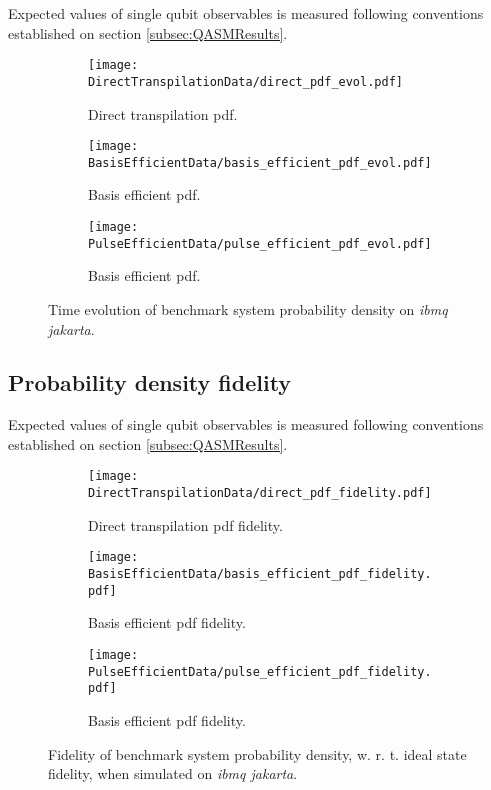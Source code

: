       Expected values of single qubit observables is measured following conventions established on section \ref{subsec:QASMResults}. 

      \begin{figure}
        \centering
        \begin{subfigure}[b]{1.0 \textwidth}
          \centering
          \texttt{[image: DirectTranspilationData/direct\_pdf\_evol.pdf]}
          \caption{Direct transpilation pdf.}
          \label{fig:PdfDirectTransp}
        \end{subfigure}
        \begin{subfigure}[b]{1.0 \textwidth}
          \centering
          \texttt{[image: BasisEfficientData/basis\_efficient\_pdf\_evol.pdf]}
          \caption{Basis efficient pdf.}
          \label{fig:PdfBasis}
        \end{subfigure}
        \begin{subfigure}[b]{1.0 \textwidth}
          \centering
          \texttt{[image: PulseEfficientData/pulse\_efficient\_pdf\_evol.pdf]}
          \caption{Basis efficient pdf.}
          \label{fig:PdfPulse}
        \end{subfigure}
        \caption{Time evolution of benchmark system probability density on \textit{ibmq jakarta}.}
        \label{fig:PdfExpectedValues}
      \end{figure}

    \subsection{Probability density fidelity}
    \label{subsec:PdfResults}

      Expected values of single qubit observables is measured following conventions established on section \ref{subsec:QASMResults}. 

      \begin{figure}
        \centering
        \begin{subfigure}[b]{1.0 \textwidth}
          \centering
          \texttt{[image: DirectTranspilationData/direct\_pdf\_fidelity.pdf]}
          \caption{Direct transpilation pdf fidelity.}
          \label{fig:PdfDirectTransp}
        \end{subfigure}
        \begin{subfigure}[b]{1.0 \textwidth}
          \centering
          \texttt{[image: BasisEfficientData/basis\_efficient\_pdf\_fidelity.pdf]}
          \caption{Basis efficient pdf fidelity.}
          \label{fig:PdfBasis}
        \end{subfigure}
        \begin{subfigure}[b]{1.0 \textwidth}
          \centering
          \texttt{[image: PulseEfficientData/pulse\_efficient\_pdf\_fidelity.pdf]}
          \caption{Basis efficient pdf fidelity.}
          \label{fig:PdfPulse}
        \end{subfigure}
        \caption{Fidelity of benchmark system probability density, w. r. t. ideal state fidelity, when simulated on \textit{ibmq jakarta}.}
        \label{fig:PdfExpectedValues}
      \end{figure}

